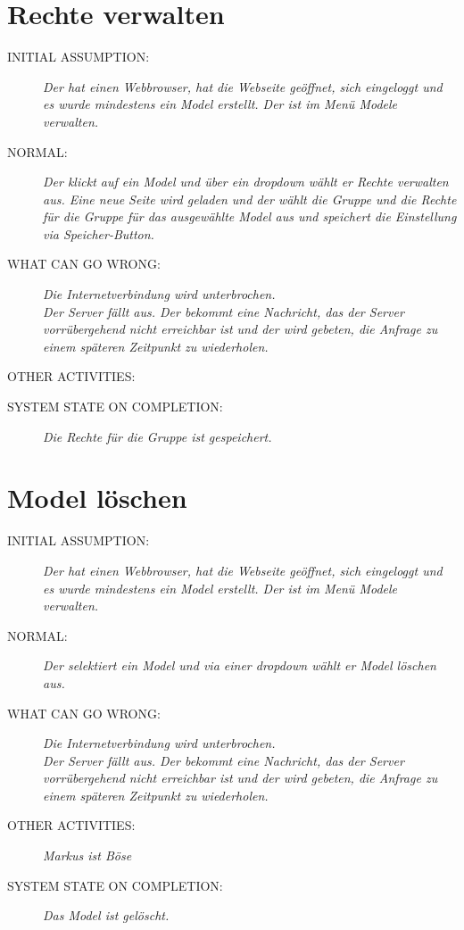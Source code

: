 \section{Rechte verwalten}
\begin{description}
  \item [INITIAL ASSUMPTION:]
    \textit{Der  hat einen Webbrowser, hat die Webseite geöffnet, sich eingeloggt und es wurde mindestens ein \gls{Model} erstellt. Der  ist im Menü \gls{Model}e verwalten.}
  \item [NORMAL:]
    \textit{Der  klickt auf ein \gls{Model} und über ein \gls{dropdown} wählt er Rechte verwalten aus.  Eine neue Seite wird geladen und der  wählt die Gruppe und die Rechte für die Gruppe für das ausgewählte \gls{Model} aus und speichert die Einstellung via Speicher-Button.}
  \item [WHAT CAN GO WRONG:]
    \textit{Die Internetverbindung wird unterbrochen.\\
Der Server fällt aus. Der  bekommt eine Nachricht, das der Server vorrübergehend nicht erreichbar ist und der  wird gebeten, die Anfrage zu einem späteren Zeitpunkt zu wiederholen.\\
}
  \item [OTHER ACTIVITIES:]
    \textit{}
  \item [SYSTEM STATE ON COMPLETION:]
    \textit{Die Rechte für die Gruppe ist gespeichert.}
\end{description}

\section{Model löschen}
\begin{description}
  \item [INITIAL ASSUMPTION:]
    \textit{Der  hat einen Webbrowser, hat die Webseite geöffnet, sich eingeloggt und es wurde mindestens ein \gls{Model} erstellt. Der  ist im Menü \gls{Model}e verwalten.}
  \item [NORMAL:]
    \textit{Der  selektiert ein \gls{Model} und via einer \gls{dropdown} wählt er \gls{Model} löschen aus.}
  \item [WHAT CAN GO WRONG:]
    \textit{Die Internetverbindung wird unterbrochen.\\
Der Server fällt aus. Der  bekommt eine Nachricht, das der Server vorrübergehend nicht erreichbar ist und der  wird gebeten, die Anfrage zu einem späteren Zeitpunkt zu wiederholen.}
  \item [OTHER ACTIVITIES:]
    \textit{Markus ist Böse}
  \item [SYSTEM STATE ON COMPLETION:]
    \textit{Das \gls{Model} ist gelöscht.}
\end{description}

